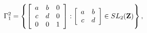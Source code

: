 \begin{equation}
\Gamma^{2}_{1} = \left\{
\left[
\begin{array}{ccc}
 a & b & 0 \\ c & d & 0 \\ 0 & 0 &1
\end{array}
\right]
 : 
\left[
\begin{array}{cc}
 a & b \\ c & d
\end{array}
\right]
 \in
SL_2({\bf Z})\right\},
\end{equation}


